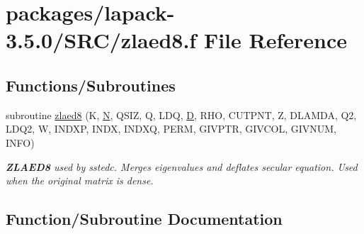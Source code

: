 \hypertarget{zlaed8_8f}{}\section{packages/lapack-\/3.5.0/\+S\+R\+C/zlaed8.f File Reference}
\label{zlaed8_8f}
\subsection*{Functions/\+Subroutines}
\begin{DoxyCompactItemize}
\item 
subroutine \hyperlink{zlaed8_8f_a9eb796d0fcb8d082409178b20686d971}{zlaed8} (K, \hyperlink{polmisc_8c_a0240ac851181b84ac374872dc5434ee4}{N}, Q\+S\+I\+Z, Q, L\+D\+Q, \hyperlink{odrpack_8h_a7dae6ea403d00f3687f24a874e67d139}{D}, R\+H\+O, C\+U\+T\+P\+N\+T, Z, D\+L\+A\+M\+D\+A, Q2, L\+D\+Q2, W, I\+N\+D\+X\+P, I\+N\+D\+X, I\+N\+D\+X\+Q, P\+E\+R\+M, G\+I\+V\+P\+T\+R, G\+I\+V\+C\+O\+L, G\+I\+V\+N\+U\+M, I\+N\+F\+O)
\begin{DoxyCompactList}\small\item\em {\bfseries Z\+L\+A\+E\+D8} used by sstedc. Merges eigenvalues and deflates secular equation. Used when the original matrix is dense. \end{DoxyCompactList}\end{DoxyCompactItemize}


\subsection{Function/\+Subroutine Documentation}
\hypertarget{zlaed8_8f_a9eb796d0fcb8d082409178b20686d971}{}
